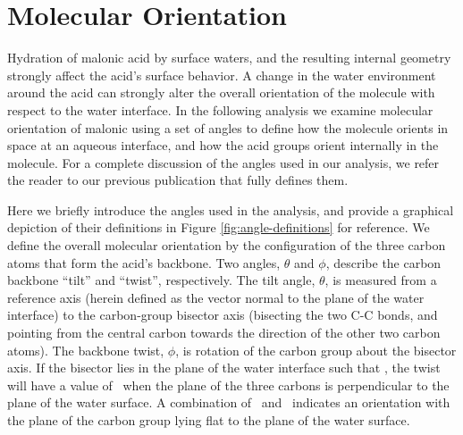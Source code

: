 \section {Molecular Orientation}

Hydration of malonic acid by surface waters, and the resulting internal geometry strongly affect the acid's surface behavior. A change in the water environment around the acid can strongly alter the overall orientation of the molecule with respect to the water interface. In the following analysis we examine molecular orientation of malonic using a set of angles to define how the molecule orients in space at an aqueous interface, and how the acid groups orient internally in the molecule. For a complete discussion of the angles used in our analysis, we refer the reader to our previous publication that fully defines them.\cite{Blower2012}

Here we briefly introduce the angles used in the analysis, and provide a graphical depiction of their definitions in Figure \ref{fig:angle-definitions} for reference. We define the overall molecular orientation by the configuration of the three carbon atoms that form the acid's backbone. Two angles, $\theta$ and $\phi$, describe the carbon backbone ``tilt'' and ``twist'', respectively. The tilt angle, $\theta$, is measured from a reference axis (herein defined as the vector normal to the plane of the water interface) to the carbon-group bisector axis (bisecting the two C-C bonds, and pointing from the central carbon towards the direction of the other two carbon atoms). The backbone twist, $\phi$, is rotation of the carbon group about the bisector axis. If the bisector lies in the plane of the water interface such that \degr, the twist will have a value of \degr~when the plane of the three carbons is perpendicular to the plane of the water surface. A combination of \degr~and \degr~indicates an orientation with the plane of the carbon group lying flat to the plane of the water surface.

